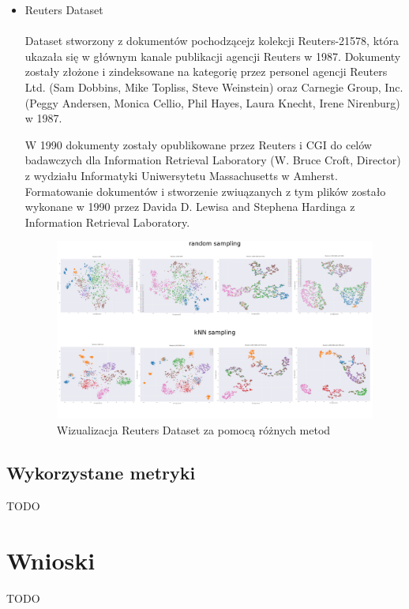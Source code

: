\documentclass{article}
\begin{document}
\begin{itemize}
    \item Reuters Dataset \cite{reuters-dataset}
\paragraph{}
Dataset stworzony z dokumentów pochodzącejz kolekcji Reuters-21578, która ukazała się w głównym kanale publikacji agencji Reuters w 1987. Dokumenty zostały złożone i zindeksowane na kategorię przez personel agencji Reuters Ltd. (Sam Dobbins, Mike Topliss, Steve Weinstein) oraz Carnegie Group, Inc. (Peggy Andersen, Monica Cellio, Phil Hayes, Laura Knecht, Irene Nirenburg) w 1987.

W 1990 dokumenty zostały opublikowane przez Reuters i CGI do celów badawczych dla Information Retrieval Laboratory (W. Bruce Croft, Director) z wydziału Informatyki Uniwersytetu Massachusetts w Amherst. Formatowanie dokumentów i stworzenie zwiuązanych z tym plików zostało wykonane w 1990 przez Davida D. Lewisa and Stephena Hardinga z Information Retrieval Laboratory.

\begin{figure}[h]
\includegraphics[scale=0.25]{reuters-dataset-results.png}
\caption{Wizualizacja Reuters Dataset za pomocą różnych metod}
\end{figure}

\end{itemize}

\subsection{Wykorzystane metryki}
TODO
 
\section{Wnioski}
\label{sec:conclusions}
TODO
\end{document}
